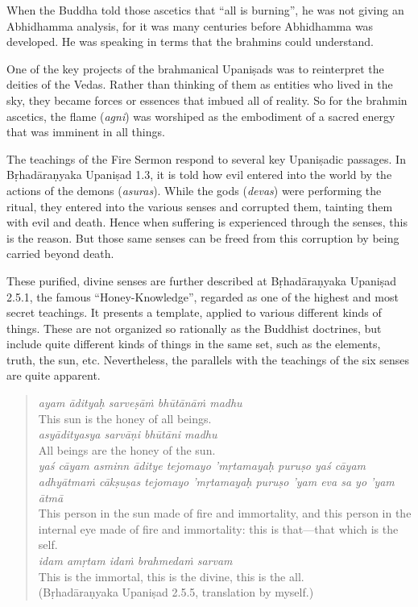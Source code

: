\documentclass[12pt,openany]{book}%
\begin{document}
When the Buddha told those ascetics that “all is burning”, he was not giving an Abhidhamma analysis, for it was many centuries before Abhidhamma was developed. He was speaking in terms that the brahmins could understand.

One of the key projects of the brahmanical \textsanskrit{Upaniṣads} was to reinterpret the deities of the Vedas. Rather than thinking of them as entities who lived in the sky, they became forces or essences that imbued all of reality. So for the brahmin ascetics, the flame (\textit{agni}) was worshiped as the embodiment of a sacred energy that was imminent in all things.

The teachings of the Fire Sermon respond to several key \textsanskrit{Upaniṣadic} passages. In \textsanskrit{Bṛhadāraṇyaka} \textsanskrit{Upaniṣad} 1.3, it is told how evil entered into the world by the actions of the demons (\textit{asuras}). While the gods (\textit{devas}) were performing the ritual, they entered into the various senses and corrupted them, tainting them with evil and death. Hence when suffering is experienced through the senses, this is the reason. But those same senses can be freed from this corruption by being carried beyond death.

These purified, divine senses are further described at \textsanskrit{Bṛhadāraṇyaka} \textsanskrit{Upaniṣad} 2.5.1, the famous “Honey-Knowledge”, regarded as one of the highest and most secret teachings. It presents a template, applied to various different kinds of things. These are not organized so rationally as the Buddhist doctrines, but include quite different kinds of things in the same set, such as the elements, truth, the sun, etc. Nevertheless, the parallels with the teachings of the six senses are quite apparent.

\begin{quotation}%
\textit{ayam \textsanskrit{ādityaḥ} \textsanskrit{sarveṣāṁ} \textsanskrit{bhūtānāṁ} madhu}\\
 This sun is the honey of all beings.\\
 \textit{\textsanskrit{asyādityasya} \textsanskrit{sarvāṇi} \textsanskrit{bhūtāni} madhu}\\
 All beings are the honey of the sun.\\
 \textit{\textsanskrit{yaś} \textsanskrit{cāyam} asminn \textsanskrit{āditye} tejomayo ’\textsanskrit{mṛtamayaḥ} \textsanskrit{puruṣo} \textsanskrit{yaś} \textsanskrit{cāyam} \textsanskrit{adhyātmaṁ} \textsanskrit{cākṣuṣas} tejomayo ’\textsanskrit{mṛtamayaḥ} \textsanskrit{puruṣo} ’yam eva sa yo ’yam \textsanskrit{ātmā}}\\
 This person in the sun made of fire and immortality, and this person in the internal eye made of fire and immortality: this is that—that which is the self.\\
 \textit{idam \textsanskrit{amṛtam} \textsanskrit{idaṁ} \textsanskrit{brahmedaṁ} sarvam}\\
 This is the immortal, this is the divine, this is the all.\\
 (\textsanskrit{Bṛhadāraṇyaka} \textsanskrit{Upaniṣad} 2.5.5, translation by myself.)

%
\end{quotation}
\end{document}
